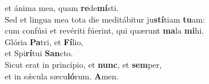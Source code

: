 \evenverse et ánima mea, quam \textbf{re}de\textbf{mí}sti.\\
\oddverse Sed et lingua mea tota die meditábitur ju\textbf{stí}tiam \textbf{tu}am:~\*\\
\oddverse cum confúsi et revériti fúerint, qui quærunt \textbf{ma}la \textbf{mi}hi.\\
\evenverse Glória \textbf{Pa}tri, et \textbf{Fí}lio,~\*\\
\evenverse et Spi\textbf{rí}tui \textbf{San}cto.\\
\oddverse Sicut erat in princípio, et \textbf{nunc}, et \textbf{sem}per,~\*\\
\oddverse et in sǽcula sæcu\textbf{ló}rum. \textbf{A}men.\\

